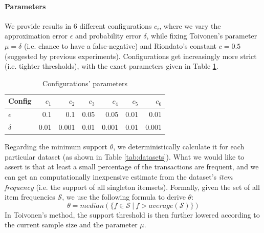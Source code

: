 \documentclass[11pt]{sigplanconf}
\renewcommand\it{\textit}
\renewcommand\S{\mathcal{S}}
\begin{document}
\paragraph{Parameters} We provide results in 6 different configurations $c_i$, where we vary the approximation error $\epsilon$ and probability error $\delta$, while fixing Toivonen's parameter $\mu=\delta$ (i.e. chance to have a false-negative) and Riondato's constant $c=0.5$ (suggested by previous experiments). Configurations get increasingly more strict (i.e. tighter thresholds), with the exact parameters given in Table \ref{tab:config}.
\begin{table}[h!]
  \begin{center}
    \begin{tabular}{l|rrrrrr}
      \hline
      Config & $c_1$ & $c_2$ & $c_3$ & $c_4$ & $c_5$ & $c_6$\\
      \hline
      $\epsilon$ & 0.1 & 0.1 & 0.05 & 0.05 & 0.01 & 0.01\\
      $\delta$ & 0.01 & 0.001 & 0.01 & 0.001 & 0.01 & 0.001\\
      \hline
    \end{tabular}
    \caption{Configurations' parameters}
    \label{tab:config}
  \end{center}
\end{table}

Regarding the minimum support $\theta$, we deterministically calculate it for each particular dataset (as shown in Table \ref{tab:datasets}). What we would like to assert is that at least a small percentage of the transactions are frequent, and we can get an computationally inexpensive estimate from the dataset's \it{item frequency} (i.e. the support of all singleton itemsets). Formally, given the set of all item frequencies $\S$, we use the following formula to derive $\theta$:
\[ \theta = median(\{ f \in \S \ | \ f > average(\S) \})
\]
In Toivonen's method, the support threshold is then further lowered according to the current sample size and the parameter $\mu$.
\end{document}
